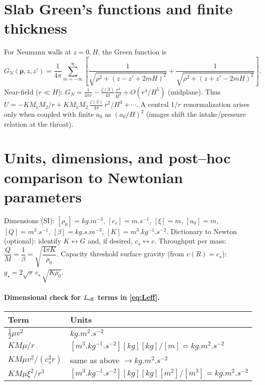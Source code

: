\documentclass[11pt]{article}
\numberwithin{equation}{section}
\theoremstyle{plain}
\theoremstyle{remark}
\theoremstyle{definition}
\begin{document}
\section{Slab Green’s functions and finite thickness}
\label{app:slab}
For Neumann walls at $z=0,H$, the Green function is
\begin{equation}
G_N(\bm\rho,z,z')=\frac{1}{4\pi}\sum_{m=-\infty}^{\infty} \left[
\frac{1}{\sqrt{\rho^2+(z-z'+2mH)^2}}
+\frac{1}{\sqrt{\rho^2+(z+z'-2mH)^2}} \right].
\end{equation}
Near-field ($r\ll H$): $G_N=\frac{1}{4\pi r}-\frac{\zeta(3)}{4\pi}\frac{r^2}{H^3}+O(r^4/H^5)$ (midplane). Thus $U=-K M_1M_2/r + K M_1M_2\,\frac{\zeta(3)}{4\pi}\,r^2/H^3+\cdots$. A central $1/r$ renormalization arises only when coupled with finite $a_0$ as $(a_0/H)^2$ (images shift the intake/pressure relation at the throat).

\section{Units, dimensions, and post–hoc comparison to Newtonian parameters}
\label{app:units}
Dimensions (SI): $[\rho_0]=\si{kg.m^{-3}}$, $[c_s]=\si{m.s^{-1}}$, $[\xi]=\si{m}$, $[a_0]=\si{m}$, $[Q]=\si{m^3.s^{-1}}$, $[\beta]=\si{kg.s.m^{-3}}$, $[K]=\si{m^3.kg^{-1}.s^{-2}}$.
Dictionary to Newton (optional): identify $K\leftrightarrow G$ and, if desired, $c_s\leftrightarrow c$.
Throughput per mass: $\dfrac{Q}{M}=\dfrac{1}{\beta}=\sqrt{\dfrac{4\pi K}{\rho_0}}$.
Capacity threshold surface gravity (from $v(R)=c_s$): $g_\star=2\sqrt{\pi}\,c_s\,\sqrt{K\rho_0}$.

\paragraph{Dimensional check for $L_{\rm eff}$ terms in \eqref{eq:Leff}.}
\begin{center}
\begin{tabular}{@{}ll@{}}
\toprule
Term & Units \\
\midrule
$\tfrac12 \mu v^2$ & $\si{kg.m^2.s^{-2}}$ \\
$K M\mu / r$ & $[\si{m^3.kg^{-1}.s^{-2}}][\si{kg}][\si{kg}]/[\si{m}]=\si{kg.m^2.s^{-2}}$ \\
$K M\mu v^2/(c_s^2 r)$ & same as above $\to \si{kg.m^2.s^{-2}}$ \\
$K M\mu \xi^2/r^3$ & $[\si{m^3.kg^{-1}.s^{-2}}][\si{kg}][\si{kg}][\si{m^2}]/[\si{m^3}]=\si{kg.m^2.s^{-2}}$ \\
\bottomrule
\end{tabular}
\end{center}
\end{document}
